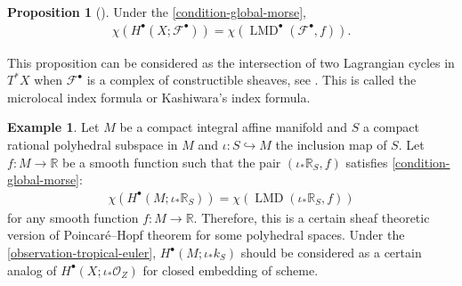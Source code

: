 \documentclass[a4paper,dvipdfmx,reqno,12pt]{amsart}
\theoremstyle{definition}
\newtheorem{example}[theorem]{Example}
\newtheorem{proposition}[theorem]{Proposition}
\newcommand{\mcal}[1]{\mathcal{#1}}%
\newcommand{\opn}[1]{\operatorname{#1}}
\newcommand{\hookto}{\hookrightarrow}
\numberwithin{equation}{section}
\begin{document}
\begin{proposition}[{\cite[Proposition 5.4.20]{MR1299726}}]
Under the \cref{condition-global-morse}, 
\begin{align}
\chi(H^{\bullet}(X;\mathcal{F}^{\bullet}))=
\chi (\opn{LMD}^{\bullet}(\mathcal{F}^{\bullet},f)).
\end{align}

\end{proposition}
This proposition can be considered as the intersection 
of two Lagrangian cycles in $T^{*}X$ when 
$\mathcal{F}^{\bullet}$ is a complex of 
constructible sheaves,
see \cite[Corollary 9.5.2,Theorem 9.5.6]{MR1299726}.
This is called the microlocal index formula or Kashiwara's 
index formula.
\begin{example}
Let $M$ be a compact integral affine manifold and $S$  
a compact rational polyhedral subspace in $M$ and 
$\iota\colon S\hookto M$ the inclusion map of $S$. 
Let $f\colon M \to \mathbb{R}$ be a smooth function such
that the pair $(\iota_*\mathbb{R}_S,f)$ satisfies 
\cref{condition-global-morse}:
\begin{align}
\chi(H^{\bullet}(M;\iota_*\mathbb{R}_S))
=\chi(\opn{LMD}(\iota_*\mathbb{R}_S,f))
\end{align}
for any smooth function $f\colon M\to \mathbb{R}$.
Therefore, this is a certain sheaf theoretic version of 
Poincar\'e--Hopf theorem for some polyhedral spaces. Under
the \cref{observation-tropical-euler}, 
$H^{\bullet}(M;\iota_*k_S)$
 should be considered as a
certain analog of 
$H^{\bullet}(X;\iota_*\mcal{O}_Z)$ for closed embedding of 
scheme.
\end{example}
\end{document}
